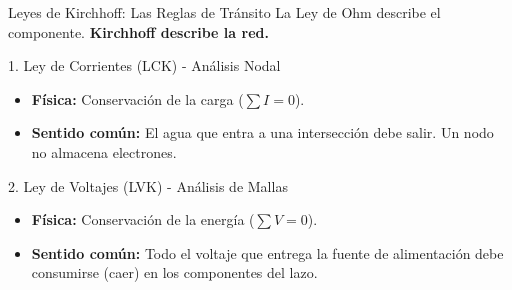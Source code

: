 \documentclass[aspectratio=169, 10pt]{beamer}
\begin{document}
\begin{frame}{Leyes de Kirchhoff: Las Reglas de Tránsito}
    La Ley de Ohm describe el componente. \textbf{Kirchhoff describe la red.}
    
    \vspace{0.3cm}
    \begin{block}{1. Ley de Corrientes (LCK) - Análisis Nodal}
        \begin{itemize}
            \item \textbf{Física:} Conservación de la carga ($\sum I = 0$).
            \item \textbf{Sentido común:} El agua que entra a una intersección debe salir. Un nodo no almacena electrones.
        \end{itemize}
    \end{block}
    
    \vspace{0.1cm}
    \begin{block}{2. Ley de Voltajes (LVK) - Análisis de Mallas}
        \begin{itemize}
            \item \textbf{Física:} Conservación de la energía ($\sum V = 0$).
            \item \textbf{Sentido común:} Todo el voltaje que entrega la fuente de alimentación debe consumirse (caer) en los componentes del lazo.
        \end{itemize}
    \end{block}
\end{frame}
\end{document}
